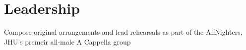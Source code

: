 \section{Leadership}

{Compose original arrangements and lead rehearsals as part of the AllNighters, JHU's premeir all-male A Cappella group}